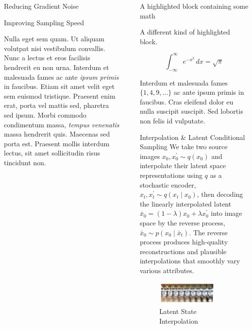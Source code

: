 \documentclass[final]{beamer}
\newlength{\sepwidth}
\newlength{\colwidth}
\newcommand{\separatorcolumn}{\begin{column}{\sepwidth}\end{column}}
\begin{document}
\begin{frame}[t]
\begin{columns}[t]
\begin{column}{\colwidth}
\begin{block}{Reducing Gradient Noise}
			\end{block}

			\begin{block}{Improving Sampling Speed}

				Nulla eget sem quam. Ut aliquam volutpat nisi vestibulum convallis. Nunc a
				lectus et eros facilisis hendrerit eu non urna. Interdum et malesuada fames
				ac ante \textit{ipsum primis} in faucibus. Etiam sit amet velit eget sem
				euismod tristique. Praesent enim erat, porta vel mattis sed, pharetra sed
				ipsum. Morbi commodo condimentum massa, \textit{tempus venenatis} massa
				hendrerit quis. Maecenas sed porta est. Praesent mollis interdum lectus,
				sit amet sollicitudin risus tincidunt non.

			\end{block}

		\end{column}

		\separatorcolumn

		\begin{column}{\colwidth}

			\begin{exampleblock}{A highlighted block containing some math}

				A different kind of highlighted block.

				$$
					\int_{-\infty}^{\infty} e^{-x^2}\,dx = \sqrt{\pi}
				$$

				Interdum et malesuada fames $\{1, 4, 9, \ldots\}$ ac ante ipsum primis in
				faucibus. Cras eleifend dolor eu nulla suscipit suscipit. Sed lobortis non
				felis id vulputate.

			\end{exampleblock}

			\begin{block}{Interpolation \& Latent Conditional Sampling}
				We take two source images $x_0, x_{0}^{'} \sim q(x_0)$ and interpolate their latent space representations using $q$ as a stochastic encoder,  $x_t, x_{t}^{'} \sim q(x_t \mid x_0)$, then decoding the linearly interpolated latent $\bar{x}_{0} = (1 - \lambda)x_{0} + \lambda x_{0}^{'}$ into image space by the reverse process, $\bar{x}_{0} \sim p(x_{0} \mid \bar{x}_{t})$. The reverse process produces high-quality reconstructions and plausible interpolations that smoothly vary various attributes.

				\begin{figure}[h]
					\centering
					\includegraphics[width=0.8\textwidth]{figs/interpolation.png}
					\caption{Latent State Interpolation}
					\label{fig:interpolation}
				\end{figure}
				

\end{block}
\end{column}
\end{columns}
\end{frame}
\end{document}
